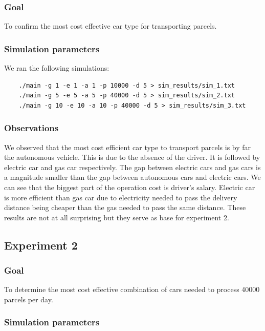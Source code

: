 \documentclass[a4paper, 11pt, a4paper]{article}
\begin{document}
\subsubsection*{Goal}
To confirm the most cost effective car type for transporting parcels.
\subsubsection*{Simulation parameters}

We ran the following simulations:
\begin{verbatim}
    ./main -g 1 -e 1 -a 1 -p 10000 -d 5 > sim_results/sim_1.txt
    ./main -g 5 -e 5 -a 5 -p 40000 -d 5 > sim_results/sim_2.txt
    ./main -g 10 -e 10 -a 10 -p 40000 -d 5 > sim_results/sim_3.txt
\end{verbatim}

\subsubsection*{Observations}

We observed that the most cost efficient car type to transport parcels is by far
the autonomous vehicle. This is due to the absence of the driver. It is followed
by electric car and gas car respectively. The gap between electric cars and gas
cars is a magnitude smaller than the gap between autonomous cars and electric
cars. We can see that the biggest part of the operation cost is driver's salary.
Electric car is more efficient than gas car due to electricity needed to pass
the delivery distance being cheaper than the gas needed to pass the same
distance. These results are not at all surprising but they serve as base for
experiment 2.

\subsection{Experiment 2}

\subsubsection*{Goal}

To determine the most cost effective combination of cars needed to process 40000
parcels per day.

\subsubsection*{Simulation parameters}
\end{document}
